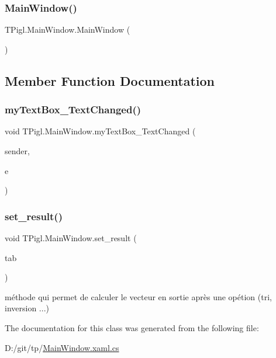 \subsubsection{\texorpdfstring{Main\+Window()}{MainWindow()}}
{\footnotesize\ttfamily T\+Pigl.\+Main\+Window.\+Main\+Window (\begin{DoxyParamCaption}{ }\end{DoxyParamCaption})}



\subsection{Member Function Documentation}
\mbox{\label{class_t_pigl_1_1_main_window_a1f2d24cc72d41c74fbe54266b45ef264}} 
\subsubsection{\texorpdfstring{my\+Text\+Box\+\_\+\+Text\+Changed()}{myTextBox\_TextChanged()}}
{\footnotesize\ttfamily void T\+Pigl.\+Main\+Window.\+my\+Text\+Box\+\_\+\+Text\+Changed (\begin{DoxyParamCaption}\item[{object}]{sender,  }\item[{Text\+Changed\+Event\+Args}]{e }\end{DoxyParamCaption})}

\mbox{\label{class_t_pigl_1_1_main_window_a492d481e2c1d21f17abfc8c5dc2eac5b}} 
\subsubsection{\texorpdfstring{set\+\_\+result()}{set\_result()}}
{\footnotesize\ttfamily void T\+Pigl.\+Main\+Window.\+set\+\_\+result (\begin{DoxyParamCaption}\item[{int \mbox{[}$\,$\mbox{]}}]{tab }\end{DoxyParamCaption})}



méthode qui permet de calculer le vecteur en sortie après une opétion (tri, inversion ...) 



The documentation for this class was generated from the following file\+:\begin{DoxyCompactItemize}
\item 
D\+:/git/tp/\hyperlink{_main_window_8xaml_8cs}{Main\+Window.\+xaml.\+cs}\end{DoxyCompactItemize}
